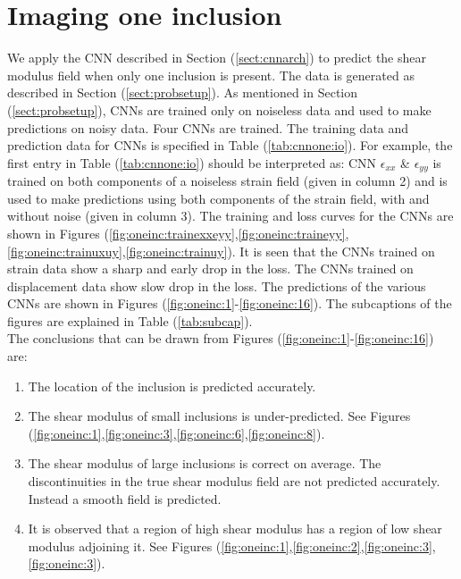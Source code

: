 \documentclass[12pt]{article}
\begin{document}
\section{\label{sect:oneinc}Imaging one inclusion}
We apply the CNN described in Section (\ref{sect:cnnarch}) to predict the shear modulus field when only one inclusion is present. The data is generated as described in Section (\ref{sect:probsetup}). As mentioned in Section (\ref{sect:probsetup}), CNNs are trained only on noiseless data and used to make predictions on noisy data. Four CNNs are trained. The training data and prediction data for CNNs is specified in Table (\ref{tab:cnnone:io}). For example, the first entry in Table (\ref{tab:cnnone:io}) should be interpreted as: CNN $\epsilon_{xx}$ \& $\epsilon_{yy}$ is trained on both components of a noiseless strain field (given in column 2) and is used to make predictions using both components of the strain field, with and without noise (given in column 3). The training and loss curves for the CNNs are shown in Figures (\ref{fig:oneinc:trainexxeyy},\ref{fig:oneinc:traineyy},\ref{fig:oneinc:trainuxuy},\ref{fig:oneinc:trainuy}). It is seen that the CNNs trained on strain data show a sharp and early drop in the loss. The CNNs trained on displacement data show slow drop in the loss. The predictions of the various CNNs are shown in Figures (\ref{fig:oneinc:1}-\ref{fig:oneinc:16}). The subcaptions of the figures are explained in Table (\ref{tab:subcap}).\\
The conclusions that can be drawn from Figures (\ref{fig:oneinc:1}-\ref{fig:oneinc:16}) are:
\begin{enumerate}
\item{The location of the inclusion is predicted accurately.}
\item{The shear modulus of small inclusions is under-predicted. See Figures (\ref{fig:oneinc:1},\ref{fig:oneinc:3},\ref{fig:oneinc:6},\ref{fig:oneinc:8}).}
\item{The shear modulus of large inclusions is correct on average. The discontinuities in the true shear modulus field are not predicted accurately. Instead a smooth field is predicted.}
\item{It is observed that a region of high shear modulus has a region of low shear modulus adjoining it. See Figures (\ref{fig:oneinc:1},\ref{fig:oneinc:2},\ref{fig:oneinc:3},\ref{fig:oneinc:3}). }
\end{enumerate}
%
\end{document}
